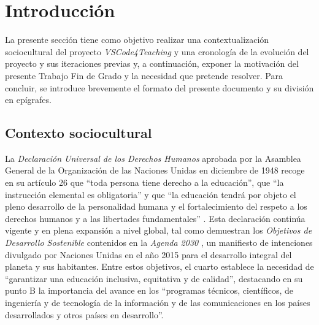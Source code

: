 \chapter{Introducción}
\label{cap:introduccion}

\setlength{\parskip}{0.75em}
\renewcommand{\baselinestretch}{1.25}
\setcounter{page}{1}

La presente sección tiene como objetivo realizar una contextualización sociocultural del proyecto \textit{VSCode4Teaching} y una cronología de la evolución del proyecto y sus iteraciones previas y, a continuación, exponer la motivación del presente Trabajo Fin de Grado y la necesidad que pretende resolver. Para concluir, se introduce brevemente el formato del presente documento y su división en epígrafes.

\section{Contexto sociocultural}
\label{sec:contxtSocial}
La \textit{Declaración Universal de los Derechos Humanos} aprobada por la Asamblea General de la Organización de las Naciones Unidas en diciembre de 1948 recoge en su artículo 26 que ``toda persona tiene derecho a la educación'', que ``la instrucción elemental es obligatoria'' y que ``la educación tendrá por objeto el pleno desarrollo de la personalidad humana y el fortalecimiento del respeto a los derechos humanos y a las libertades fundamentales'' \cite{ONUDUDH}. Esta declaración continúa vigente y en plena expansión a nivel global, tal como demuestran los \textit{Objetivos de Desarrollo Sostenible} contenidos en la \textit{Agenda 2030} \cite{ONU2030}, un manifiesto de intenciones divulgado por Naciones Unidas en el año 2015 para el desarrollo integral del planeta y sus habitantes. Entre estos objetivos, el cuarto establece la necesidad de ``garantizar una educación inclusiva, equitativa y de calidad'', destacando en su punto B la importancia del avance en los ``programas técnicos, científicos, de ingeniería y de tecnología de la información y de las comunicaciones en los países desarrollados y otros países en desarrollo''.

